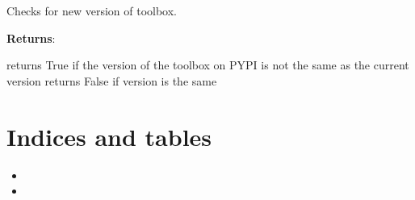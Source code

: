 \documentclass[letterpaper,10pt,english]{sphinxmanual}
\begin{document}
Checks for new version of toolbox.

\textbf{Returns}:

returns True if the version of the toolbox on PYPI is not the same as the current version returns False if version is the same


\chapter{Indices and tables}
\label{index:indices-and-tables}\begin{itemize}
\item {} 

\item {} 

\end{itemize}



\renewcommand{\indexname}{Index}
\printindex
\end{document}

